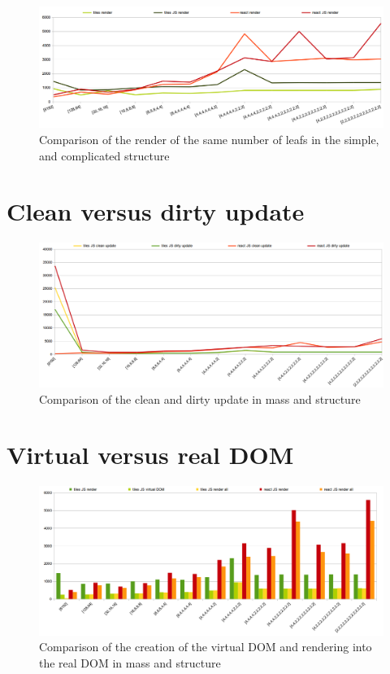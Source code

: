 \documentclass[oneside, 12pt]{book}
\begin{document}
	\begin{figure}[h]
	\centering  
		\includegraphics[scale=0.55]{images/benchmarks/mvs_render.png}
		\caption{Comparison of the render of the same number of leafs in the simple, and complicated structure}
		\label{img:benchmarks-mass-vs-structure-render}
	\end{figure}

\section{Clean versus dirty update}\label{sec:benchmarks-clean-vs-dirty-update}

	\begin{figure}[h]
	\centering  
		\includegraphics[scale=0.5]{images/benchmarks/mvs_dirty_vs_clean_update.png}
		\caption{Comparison of the clean and dirty update in mass and structure}
		\label{img:benchmarks-mass-vs-structure-dirty-vs-clean-update}
	\end{figure}


\section{Virtual versus real DOM}\label{sec:benchmarks-clean-vs-dirty-update}

	\begin{figure}[h]
	\centering  
		\includegraphics[scale=0.5]{images/benchmarks/mvs_render_vs_virtual_.png}
		\caption{Comparison of the creation of the virtual DOM and rendering into the real DOM in mass and structure}
		\label{img:benchmarks-mass-vs-structure-virtual-vs-real}
	\end{figure}
\end{document}
